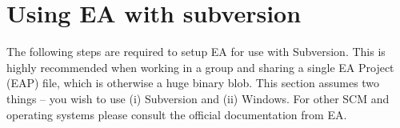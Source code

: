 \newpage

\section{Using EA with subversion}
\visHeader

The following steps are required to setup EA for use with Subversion. This is
highly recommended when working in a group and sharing a single EA Project (EAP) file, which is otherwise a huge binary blob. This section assumes two things -- you wish to use (i) Subversion and (ii) Windows. For other SCM
and operating systems please consult the official documentation from EA.








